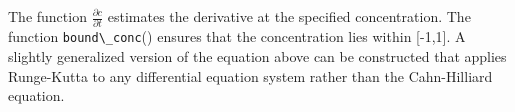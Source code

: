 \documentclass[book.tex]{subfiles}
\begin{document}
The function $\frac{\partial c}{\partial t}$ estimates the derivative at the specified concentration.  The function \lstinline{bound\_conc}() ensures that the concentration lies within [-1,1]. A slightly generalized version of the equation above can be constructed that applies Runge-Kutta to any differential equation system rather than the Cahn-Hilliard equation.
\end{document}
